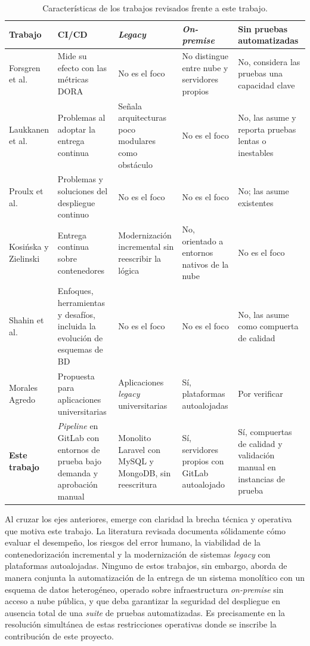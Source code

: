 \begin{table}[!htbp]
\centering
\footnotesize
\renewcommand{\arraystretch}{1.25}
\begin{tabularx}{\textwidth}{@{}>{\raggedright\arraybackslash}p{2.6cm}*{4}{>{\raggedright\arraybackslash}X}@{}}
\toprule
\textbf{Trabajo} & \textbf{CI/CD} & \textbf{\emph{Legacy}} & \textbf{\emph{On-premise}} & \textbf{Sin pruebas automatizadas} \\
\midrule
Forsgren et al. \cite{Forsgren2018}
  & Mide su efecto con las métricas DORA
  & No es el foco
  & No distingue entre nube y servidores propios
  & No, considera las pruebas una capacidad clave \\
Laukkanen et al. \cite{Laukkanen2017}
  & Problemas al adoptar la entrega continua
  & Señala arquitecturas poco modulares como obstáculo
  & No es el foco
  & No, las asume y reporta pruebas lentas o inestables \\
Proulx et al. \cite{Proulx2018}
  & Problemas y soluciones del despliegue continuo
  & No es el foco
  & No es el foco
  & No; las asume existentes \\
Kosińska y Zielinski \cite{Kosinska2020}
  & Entrega continua sobre contenedores
  & Modernización incremental sin reescribir la lógica
  & No, orientado a entornos nativos de la nube
  & No es el foco \\
Shahin et al. \cite{Shahin2017}
  & Enfoques, herramientas y desafíos, incluida la evolución de esquemas de BD
  & No es el foco
  & No es el foco
  & No, las asume como compuerta de calidad \\
Morales Agredo \cite{MoralesAgredo2021}
  & Propuesta para aplicaciones universitarias
  & Aplicaciones \emph{legacy} universitarias
  & Sí, plataformas autoalojadas
  & Por verificar \\
\midrule
\rowcolor{black!10}
\textbf{Este trabajo}
  & \emph{Pipeline} en GitLab con entornos de prueba bajo demanda y aprobación manual
  & Monolito Laravel con MySQL y MongoDB, sin reescritura
  & Sí, servidores propios con GitLab autoalojado
  & Sí, compuertas de calidad y validación manual en instancias de prueba \\
\bottomrule
\end{tabularx}
\caption{Características de los trabajos revisados frente a este trabajo.}\label{tab:comparativo}
\end{table}

Al cruzar los ejes anteriores, emerge con claridad la brecha técnica y operativa que motiva este trabajo.
La literatura revisada documenta sólidamente cómo evaluar el desempeño, los riesgos del error humano,
la viabilidad de la contenedorización incremental y la modernización de sistemas \emph{legacy}
con plataformas autoalojadas. Ninguno de estos trabajos, sin embargo, aborda de manera conjunta la automatización de la
entrega de un sistema monolítico con un esquema de datos heterogéneo, operado sobre infraestructura
\emph{on-premise} sin acceso a nube pública, y que deba garantizar la seguridad del despliegue en
ausencia total de una \emph{suite} de pruebas automatizadas. Es precisamente en la resolución simultánea
de estas restricciones operativas donde se inscribe la contribución de este proyecto.



